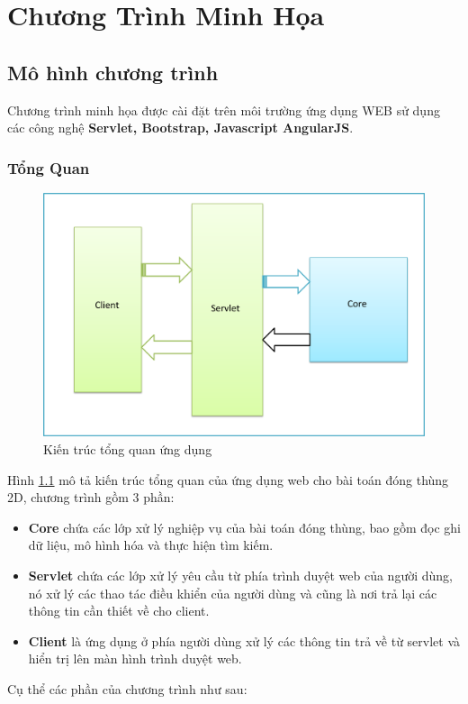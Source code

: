 \chapter{Chương Trình Minh Họa}
\label{chap:presentation}

\section{Mô hình chương trình}
Chương trình minh họa được cài đặt trên môi trường ứng dụng WEB sử dụng các công nghệ \textbf{Servlet, Bootstrap, Javascript AngularJS}.
\subsection{Tổng Quan}
\begin{figure}
	\centering
	\includegraphics[scale=0.5]{figures/app-overview.png}
	\caption{Kiến trúc tổng quan ứng dụng \label{fig:appOverview}}
\end{figure}

Hình \ref{fig:appOverview} mô tả kiến trúc tổng quan của ứng dụng web cho bài toán đóng thùng 2D, chương trình gồm 3 phần:
\begin{itemize}
	\item \textbf{Core} chứa các lớp xử lý nghiệp vụ của bài toán đóng thùng, bao gồm đọc ghi dữ liệu, mô hình hóa và thực hiện tìm kiếm.
	\item \textbf{Servlet} chứa các lớp xử lý yêu cầu từ phía trình duyệt web của người dùng, nó xử lý các thao tác điều khiển của người dùng và cũng là nơi trả lại các thông tin cần thiết về cho client.
	\item \textbf{Client} là ứng dụng ở phía người dùng xử lý các thông tin trả về từ servlet và hiển trị lên màn hình trình duyệt web.
\end{itemize}
Cụ thể các phần của chương trình như sau:
